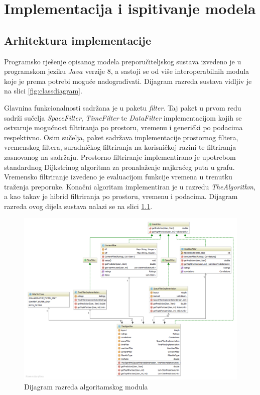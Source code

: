 \documentclass[times, utf8, diplomski, numeric]{fer}
\begin{document}
\chapter{Implementacija i ispitivanje modela}
\section{Arhitektura implementacije}

Programsko rješenje opisanog modela preporučiteljskog sustava izvedeno je u
programskom jeziku $Java$ verzije $8$, a sastoji se od više interoperabilnih
modula koje je prema potrebi moguće nadograđivati. Dijagram razreda sustava
vidljiv je na slici \ref{fig:classdiagram}.

Glavnina funkcionalnosti sadržana je u paketu \emph{filter}. Taj paket u prvom
redu sadrži sučelja \emph{SpaceFilter}, \emph{TimeFilter} te \emph{DataFilter}
implementacijom kojih se ostvaruje mogućnost filtriranja po prostoru, vremenu i
generički po podacima respektivno.
Osim sučelja, paket sadržava implementacije prostornog filtera, vremenskog
filtera, suradničkog filtriranja na korisničkoj razini te filtriranja zasnovanog
na sadržaju. Prostorno filtriranje implementirano je upotrebom standardnog
Dijkstrinog algoritma za pronalaženje najkraćeg puta u grafu. Vremensko
filtriranje izvedeno je evaluacijom funkcije vremena u trenutku traženja
preporuke. Konačni algoritam implementiran je u razredu \emph{TheAlgorithm}, a
kao takav je hibrid filtriranja po prostoru, vremenu i podacima. Dijagram
razreda ovog dijela sustava nalazi se na slici \ref{fig:diagramalgo}.

\begin{figure}[H]
	\centering
	\includegraphics[width=14cm]{images/diagrams/filterdiag.png}
	\caption{Dijagram razreda algoritamskog modula}
	\label{fig:diagramalgo}
\end{figure}
\end{document}
